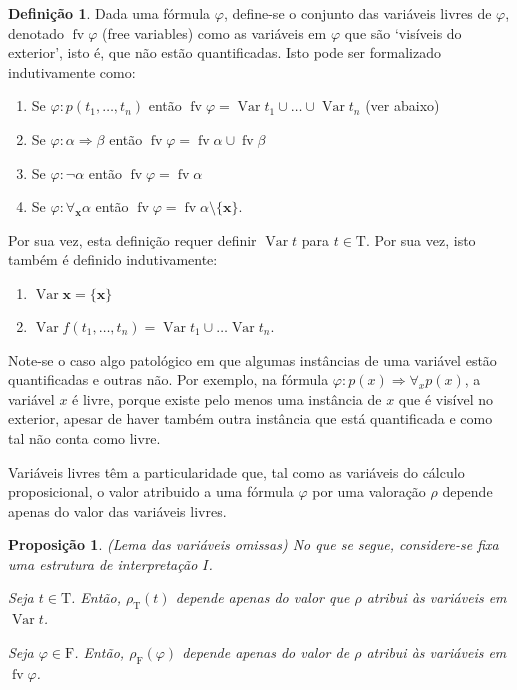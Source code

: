 \documentclass{report}
\newtheorem{prop}{Proposição}
\theoremstyle{definition}
\newtheorem{definicao}{Definição}
\theoremstyle{remark}
\renewcommand{\bf}[1]{\mathbf{#1}}
\newcommand{\F}{\mathrm{F}}
\newcommand{\T}{\mathrm{T}}
\DeclareMathOperator{\var}{Var}
\DeclareMathOperator{\fv}{fv}
\newcommand{\imply}{\mathbin{\Rightarrow}}
\begin{document}
	\begin{definicao}
	Dada uma fórmula $\varphi$, define-se o conjunto das variáveis livres de $\varphi$, denotado $\fv \varphi$ (free variables) como as variáveis em $\varphi$ que são `visíveis do exterior', isto é, que não estão quantificadas. Isto pode ser formalizado indutivamente como:
	
	\begin{enumerate}
	\item Se $\varphi : p(t_1,\dots,t_n)$ então $\fv \varphi = \var t_1 \cup \dots \cup \var t_n$ (ver abaixo)
	
	\item Se $\varphi : \alpha \imply \beta$ então $\fv \varphi = \fv \alpha \cup \fv \beta$
	
	\item Se $\varphi : \neg \alpha$ então $\fv \varphi = \fv \alpha$
	
	\item Se $\varphi : \forall_{\bf x} \alpha$ então $\fv \varphi = \fv \alpha \setminus \{\bf x\}$.
	\end{enumerate}
	
	Por sua vez, esta definição requer definir $\var t$ para $t \in \T$. Por sua vez, isto também é definido indutivamente:
	
	\begin{enumerate}
	\item $\var \bf x = \{\bf x\}$
	
	\item $\var f(t_1, \dots, t_n) = \var t_1 \cup \dots \var t_n$.
	\end{enumerate}
	\end{definicao}
	
	Note-se o caso algo patológico em que algumas instâncias de uma variável estão quantificadas e outras não. Por exemplo, na fórmula $\varphi : p(x) \imply \forall_x p(x)$, a variável $x$ é livre, porque existe pelo menos uma instância de $x$ que é visível no exterior, apesar de haver também outra instância que está quantificada e como tal não conta como livre.
	
	Variáveis livres têm a particularidade que, tal como as variáveis do cálculo proposicional, o valor atribuido a uma fórmula $\varphi$ por uma valoração $\rho$ depende apenas do valor das variáveis livres.
	
	\begin{prop} (Lema das variáveis omissas) No que se segue, considere-se fixa uma estrutura de interpretação $I$.
	
	Seja $t \in \T$. Então, $\rho_\T(t)$ depende apenas do valor que $\rho$ atribui às variáveis em $\var t$.
	
	Seja $\varphi \in \F$. Então, $\rho_\F(\varphi)$ depende apenas do valor de $\rho$ atribui às variáveis em $\fv \varphi$.
	\end{prop}
	
\end{document}
